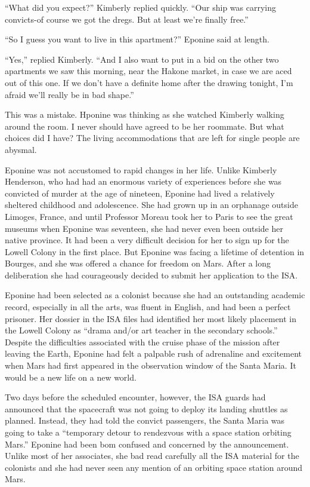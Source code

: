 \documentclass[]{article}
\begin{document}
{“What did you expect?” Kimberly replied quickly. “Our ship was carrying convicts-of course we got the dregs. But at least we’re finally free.”

“So I guess you want to live in this apartment?” Eponine said at length.

“Yes,” replied Kimberly. “And I also want to put in a bid on the other two apartments we saw this morning, near the Hakone market, in case we are aced out of this one. If we don’t have a definite home after the drawing tonight, I’m afraid we’ll really be in bad shape.”

This was a mistake. Hponine was thinking as she watched Kimberly walking around the room. I never should have agreed to be her roommate. But what choices did I have? The living accommodations that are left for single people are abysmal.

Eponine was not accustomed to rapid changes in her life. Unlike Kimberly Henderson, who had had an enormous variety of experiences before she was convicted of murder at the age of nineteen, Eponine had lived a relatively sheltered childhood and adolescence. She had grown up in an orphanage outside Limoges, France, and until Professor Moreau took her to Paris to see the great museums when Eponine was seventeen, she had never even been outside her native province. It had been a very difficult decision for her to sign up for the Lowell Colony in the first place. But Eponine was facing a lifetime of detention in Bourges, and she was offered a chance for freedom on Mars. After a long deliberation she had courageously decided to submit her application to the ISA.

Eponine had been selected as a colonist because she had an outstanding academic record, especially in all the arts, was fluent in English, and had been a perfect prisoner. Her dossier in the ISA files had identified her most likely placement in the Lowell Colony as “drama and/or art teacher in the secondary schools.” Despite the difficulties associated with the cruise phase of the mission after leaving the Earth, Eponine had felt a palpable rush of adrenaline and excitement when Mars had first appeared in the observation window of the Santa Maria. It would be a new life on a new world.

Two days before the scheduled encounter, however, the ISA guards had announced that the spacecraft was not going to deploy its landing shuttles as planned. Instead, they had told the convict passengers, the Santa Maria was going to take a “temporary detour to rendezvous with a space station orbiting Mars.” Eponine had been bom confused and concerned by the announcement. Unlike most of her associates, she bad read carefully all the ISA material for the colonists and she had never seen any mention of an orbiting space station around Mars.

}
\end{document}
